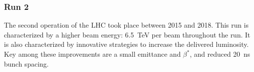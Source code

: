
\subsubsection{Run 2}

The second operation of the LHC took place between 2015 and 2018.
This run is characterized by a higher beam energy: 6.5~TeV per beam throughout the run.
It is also characterized by innovative strategies to increase the delivered luminosity.
Key among these improvements are a small emittance and $\beta^*$, and reduced 20~ns bunch spacing.

